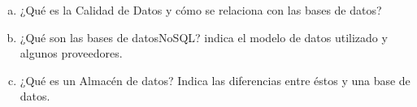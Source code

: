 \documentclass{article}
\begin{document}
\begin{enumerate}
\begin{enumerate}[a)]
            \item ¿Qué es la Calidad de Datos y cómo se relaciona con las bases de datos?
            \item ¿Qué son las bases de datosNoSQL? indica el modelo de datos utilizado y algunos proveedores.
            \item ¿Qué es un Almacén de datos? Indica las diferencias entre éstos y una base de datos.
    
            \end{enumerate}
    \end{enumerate}

    
\end{document}
